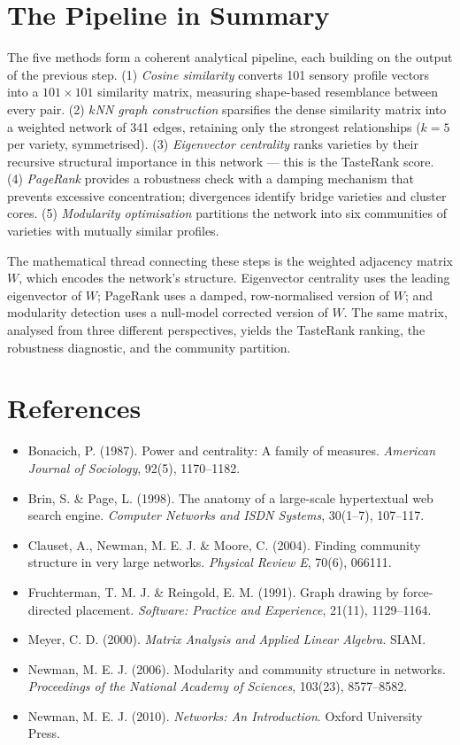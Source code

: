 \documentclass[11pt]{article}
\begin{document}
\section{The Pipeline in Summary}

The five methods form a coherent analytical pipeline, each building on the output of the previous step. (1) \emph{Cosine similarity} converts 101 sensory profile vectors into a $101 \times 101$ similarity matrix, measuring shape-based resemblance between every pair. (2) \emph{$k$NN graph construction} sparsifies the dense similarity matrix into a weighted network of 341 edges, retaining only the strongest relationships ($k = 5$ per variety, symmetrised). (3) \emph{Eigenvector centrality} ranks varieties by their recursive structural importance in this network --- this is the TasteRank score. (4) \emph{PageRank} provides a robustness check with a damping mechanism that prevents excessive concentration; divergences identify bridge varieties and cluster cores. (5) \emph{Modularity optimisation} partitions the network into six communities of varieties with mutually similar profiles.

The mathematical thread connecting these steps is the weighted adjacency matrix $W$, which encodes the network's structure. Eigenvector centrality uses the leading eigenvector of $W$; PageRank uses a damped, row-normalised version of $W$; and modularity detection uses a null-model corrected version of $W$. The same matrix, analysed from three different perspectives, yields the TasteRank ranking, the robustness diagnostic, and the community partition.

\section*{References}

\begin{itemize}[leftmargin=2em,itemsep=0.2em]
\item Bonacich, P. (1987). Power and centrality: A family of measures. \emph{American Journal of Sociology}, 92(5), 1170--1182.
\item Brin, S. \& Page, L. (1998). The anatomy of a large-scale hypertextual web search engine. \emph{Computer Networks and ISDN Systems}, 30(1--7), 107--117.
\item Clauset, A., Newman, M. E. J. \& Moore, C. (2004). Finding community structure in very large networks. \emph{Physical Review E}, 70(6), 066111.
\item Fruchterman, T. M. J. \& Reingold, E. M. (1991). Graph drawing by force-directed placement. \emph{Software: Practice and Experience}, 21(11), 1129--1164.
\item Meyer, C. D. (2000). \emph{Matrix Analysis and Applied Linear Algebra}. SIAM.
\item Newman, M. E. J. (2006). Modularity and community structure in networks. \emph{Proceedings of the National Academy of Sciences}, 103(23), 8577--8582.
\item Newman, M. E. J. (2010). \emph{Networks: An Introduction}. Oxford University Press.
\end{itemize}
\end{document}
